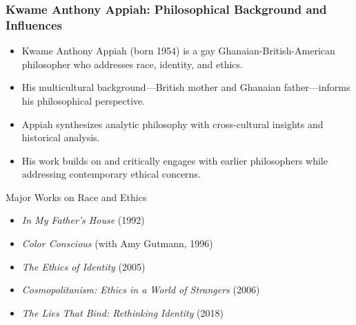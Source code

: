 \documentclass{beamer}
\begin{document}
	\begin{frame}
		\frametitle{Kwame Anthony Appiah: Philosophical Background and Influences}
		
		\begin{itemize}
			\item Kwame Anthony Appiah (born 1954) is a gay Ghanaian-British-American philosopher who addresses race, identity, and ethics.
			\item His multicultural background—British mother and Ghanaian father—informs his philosophical perspective.
			\item Appiah synthesizes analytic philosophy with cross-cultural insights and historical analysis.
			\item His work builds on and critically engages with earlier philosophers while addressing contemporary ethical concerns.
		\end{itemize}
		
		\begin{block}{Major Works on Race and Ethics}
			\scriptsize
			\begin{itemize}
				\item \textit{In My Father's House} (1992)
				\item \textit{Color Conscious} (with Amy Gutmann, 1996)
				\item \textit{The Ethics of Identity} (2005)
				\item \textit{Cosmopolitanism: Ethics in a World of Strangers} (2006)
				\item \textit{The Lies That Bind: Rethinking Identity} (2018)
			\end{itemize}
		\end{block}
		
	\end{frame}
	
\end{document}
